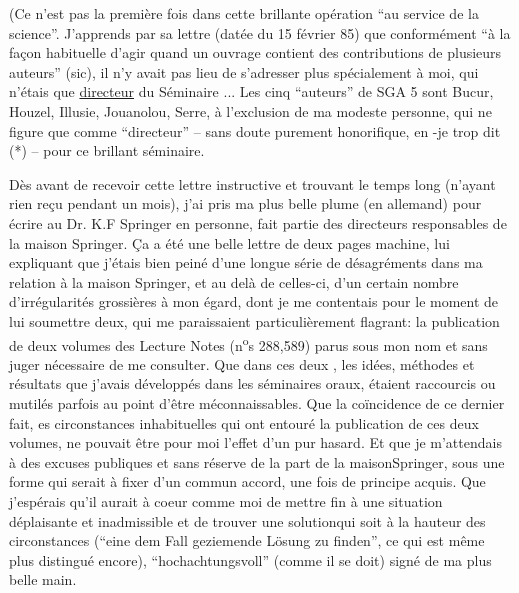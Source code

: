 (Ce n'est pas la première fois dans cette brillante opération ``au service de la science''. J'apprends par sa lettre (datée du 15 février 85) que conformément  ``à la façon habituelle d'agir quand un ouvrage contient des contributions de plusieurs auteurs'' (sic), il n'y avait pas lieu de s'adresser plus spécialement à moi, qui n'étais que \uline{directeur} du Séminaire ... \deleted{(}Les cinq ``auteurs'' de SGA 5 sont Bucur, Houzel, Illusie, Jouanolou, Serre, à l'exclusion de ma modeste personne, qui  ne figure que comme ``directeur'' -- sans doute purement honorifique, en -je trop dit (*) -- pour ce brillant séminaire.

Dès avant de recevoir cette lettre instructive et trouvant le temps long (n'ayant rien reçu pendant un mois), j'ai pris ma plus belle plume (en allemand) pour écrire au Dr. K.F Springer en personne,  fait partie des directeurs responsables de la maison Springer. Ça a été une belle  lettre de deux pages machine, lui expliquant que j'étais bien peiné d'une longue série de désagréments dans ma relation à la maison Springer, et au delà de celles-ci, d'un certain nombre d'irrégularités grossières à mon égard, dont je me contentais pour le moment de lui soumettre deux, qui me paraissaient particulièrement flagrant: la publication de deux volumes des Lecture Notes (n\textsuperscript{o}s 288,589) parus sous mon nom et sans  juger nécessaire de me consulter. Que dans ces deux , les idées, méthodes et résultats que j'avais développés dans les séminaires oraux, étaient raccourcis ou mutilés parfois au point d'être méconnaissables. Que la coïncidence de ce dernier fait,  es circonstances inhabituelles qui ont entouré la publication de ces deux volumes, ne pouvait être pour moi l'effet d'un pur hasard. Et que je m'attendais à des excuses publiques et sans réserve de la part de la maison\inserted{ }Springer, sous une forme qui serait à fixer d'un commun accord, une fois  de principe  acquis. Que j'espérais qu'il aurait à coeur comme moi de mettre fin à une situation déplaisante et inadmissible et de trouver une solutionqui soit à la hauteur des circonstances (``eine dem Fall geziemende Lösung zu finden'', ce qui  est même plus distingué encore), ``hochachtungsvoll'' (comme il se doit) signé de ma plus belle main.

